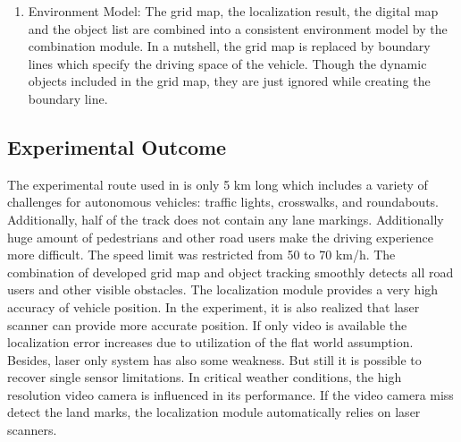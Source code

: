 \begin{enumerate}[label=\Alph*]
    \item Environment Model: The grid map, the localization result, the digital map and the object list are combined into a consistent environment model by the combination module. In a nutshell, the grid map is replaced by boundary lines which specify the driving space of the vehicle. Though the dynamic objects included in the grid map, they are just ignored while creating the boundary line.
\end{enumerate}

\subsection{Experimental Outcome}
The experimental route used in \cite{Kunz_2015} is only 5 km long which includes a variety of challenges for autonomous vehicles: traffic lights, crosswalks, and roundabouts. Additionally, half of the track does not contain any lane markings. Additionally huge amount of pedestrians and other road users make the driving experience more difficult. The speed limit was restricted from 50 to 70 km/h. The combination of developed grid map and object tracking smoothly detects all road users and other visible obstacles. The localization module provides a very high accuracy of vehicle position. In the experiment, it is also realized that laser scanner can provide more accurate position. If only video is available the localization error increases due to utilization of the flat world assumption. Besides, laser only system has also some weakness. But still it is possible to recover single sensor limitations. In critical weather conditions, the high resolution video camera is influenced in its performance. If the video camera miss detect the land marks, the localization module automatically relies on laser scanners.
